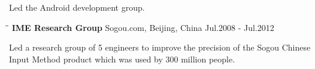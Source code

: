 \documentclass{res}
\begin{document}
\begin{resume}
   Led the Android development group. %
   \vspace{-0.1in}
   \begin{tabbing}
   \hspace{2in}\= \hspace{3in}\= \kill %
    {\bf IME Research Group} \>Sogou.com, Beijing, China     \>Jul.2008 - Jul.2012\\
   \end{tabbing}\vspace{-30pt}      %
   Led a research group of 5 engineers to improve the precision of the Sogou Chinese Input Method product which was used by 300 million people.


\end{resume}
\end{document}
